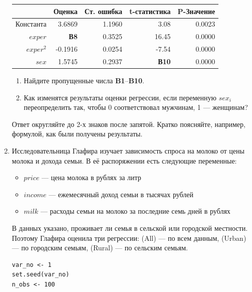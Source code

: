 \documentclass[12pt, a4paper]{article}
\begin{document}
\begin{enumerate}
\begin{table}[ht]
\centering
\begin{tabular}{rrrrr}
  \hline
 & Оценка & Ст. ошибка & t-статистика & P-Значение \\
  \hline
Константа & 3.6869 & 1.1960 & 3.08 & 0.0023 \\
  $exper$ & \textbf{В8} & 0.3525 & 16.45 & 0.0000 \\
  $exper^2$ & -0.1916 & 0.0254 & -7.54 & 0.0000 \\
  $sex$ & 1.5745 & 0.2937 & \textbf{В10} & 0.0000 \\
   \hline
\end{tabular}
\end{table}



\begin{enumerate}
\item Найдите пропущенные числа \textbf{B1}--\textbf{B10}.

\item Как изменятся результаты оценки регрессии, если переменную $sex_i$ переопределить так, чтобы 0 соответствовал мужчинам, 1 — женщинам?
\end{enumerate}

Ответ округляйте до 2-х знаков после запятой. Кратко поясняйте, например, формулой, как были получены результаты.

\item Исследовательница Глафира изучает зависимость спроса на молоко от цены молока и дохода семьи. В её распоряжении есть следующие переменные:

\begin{itemize}
\item $price$ — цена молока в рублях за литр
\item $income$ — ежемесячный доход семьи в тысячах рублей
\item $milk$ — расходы семьи на молоко за последние семь дней в рублях
\end{itemize}

В данных указано, проживает ли семья в сельской или городской местности. Поэтому Глафира оценила три регрессии: (All) — по всем данным, (Urban) — по городским семьям, (Rural) — по сельским семьям.

\begin{verbatim}
var_no <- 1
set.seed(var_no)
n_obs <- 100


\end{verbatim}
\end{enumerate}
\end{document}
